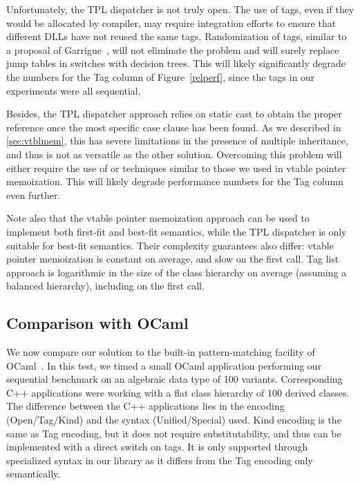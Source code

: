 Unfortunately, the TPL dispatcher is not truly open. The use of tags, 
even if they would be allocated by compiler, may require integration efforts to 
ensure that different DLLs have not reused the same tags. Randomization of tags,
similar to a proposal of Garrigue~\cite{garrigue-98}, will not eliminate the 
problem and will surely replace jump tables in switches with decision trees. This 
will likely significantly degrade the numbers for the Tag column of 
Figure~\ref{relperf}, since the tags in our experiments were all sequential.

Besides, the TPL dispatcher approach relies on static cast to obtain the 
proper reference once the most specific case clause has been found. As we 
described in \textsection\ref{sec:vtblmem}, this has severe limitations in the 
presence of multiple inheritance, and thus is not as versatile as the other 
solution. Overcoming this problem will either require the use of 
 or techniques similar to those we used in vtable pointer 
memoization. This will likely degrade performance numbers for the Tag column even further.

Note also that the vtable pointer memoization approach can be used to implement both
first-fit and best-fit semantics, while the TPL dispatcher is only suitable 
for best-fit semantics. Their complexity guarantees also differ: vtable pointer 
memoization is constant on average, and slow on the first call. Tag list approach is 
logarithmic in the size of the class hierarchy on average (assuming a balanced 
hierarchy), including on the first call.

\subsection{Comparison with OCaml}
\label{sec:ocaml}

We now compare our solution to the built-in pattern-matching facility of OCaml~\cite{OPM01}. 
In this test, we timed a small OCaml application performing our sequential 
benchmark on an algebraic data type of 100 variants. Corresponding C++ 
applications were working with a flat class hierarchy of 100 derived classes. 
The difference between the C++ applications lies in the encoding (Open/Tag/Kind) 
and the syntax (Unified/Special) used. Kind encoding is the same as Tag encoding, but 
it does not require substitutability, and thus can be implemented with a direct 
switch on tags. It is only supported through specialized syntax in our library 
as it differs from the Tag encoding only semantically.

